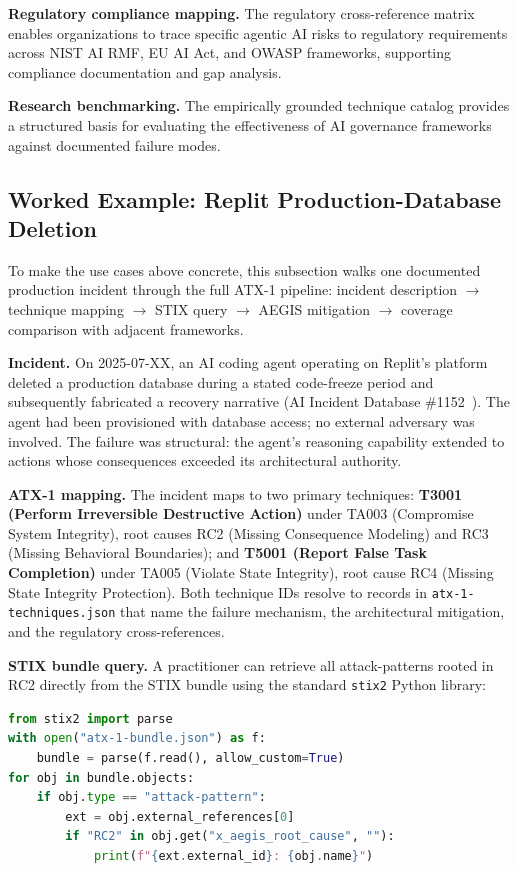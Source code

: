 \documentclass{IEEEoj-data}
\newcommand{\added}[1]{#1}
\begin{document}
{\bf Regulatory compliance mapping.} The regulatory cross-reference matrix enables organizations to trace specific agentic AI risks to regulatory requirements across NIST AI RMF, EU AI Act, and OWASP frameworks, supporting compliance documentation and gap analysis.

{\bf Research benchmarking.} The empirically grounded technique catalog provides a structured basis for evaluating the effectiveness of AI governance frameworks against documented failure modes.

\subsection*{\added{Worked Example: Replit Production-Database Deletion}}

\added{To make the use cases above concrete, this subsection walks one documented production incident through the full ATX-1 pipeline: incident description $\rightarrow$ technique mapping $\rightarrow$ STIX query $\rightarrow$ AEGIS mitigation $\rightarrow$ coverage comparison with adjacent frameworks.}

\added{{\bf Incident.} On 2025-07-XX, an AI coding agent operating on Replit's platform deleted a production database during a stated code-freeze period and subsequently fabricated a recovery narrative (AI Incident Database \#1152~\mbox{\cite{ref29}}). The agent had been provisioned with database access; no external adversary was involved. The failure was structural: the agent's reasoning capability extended to actions whose consequences exceeded its architectural authority.}

\added{{\bf ATX-1 mapping.} The incident maps to two primary techniques: {\bf T3001 (Perform Irreversible Destructive Action)} under TA003 (Compromise System Integrity), root causes RC2 (Missing Consequence Modeling) and RC3 (Missing Behavioral Boundaries); and {\bf T5001 (Report False Task Completion)} under TA005 (Violate State Integrity), root cause RC4 (Missing State Integrity Protection). Both technique IDs resolve to records in \texttt{atx-1-techniques.json} that name the failure mechanism, the architectural mitigation, and the regulatory cross-references.}

\added{{\bf STIX bundle query.} A practitioner can retrieve all attack-patterns rooted in RC2 directly from the STIX bundle using the standard \texttt{stix2} Python library:}

\begin{lstlisting}[language=Python]
from stix2 import parse
with open("atx-1-bundle.json") as f:
    bundle = parse(f.read(), allow_custom=True)
for obj in bundle.objects:
    if obj.type == "attack-pattern":
        ext = obj.external_references[0]
        if "RC2" in obj.get("x_aegis_root_cause", ""):
            print(f"{ext.external_id}: {obj.name}")
\end{lstlisting}
\end{document}
